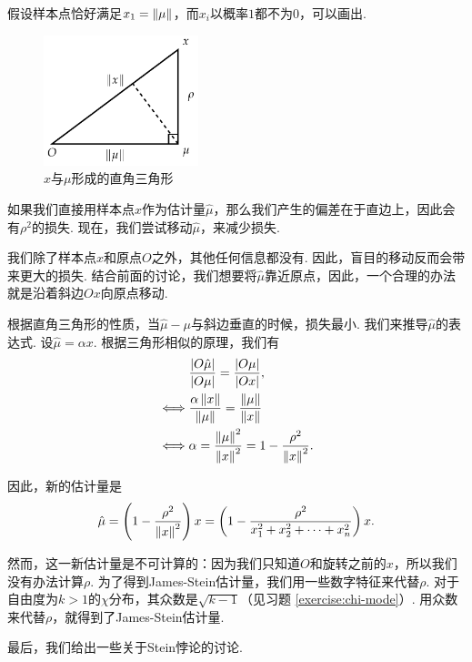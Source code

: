 假设样本点恰好满足$x_1=\left\|\mu\right\|$，而$x_i$以概率$1$都不为$0$，可以画出. 
\begin{figure}[ht]
    \centering
    \includegraphics[width=0.4\textwidth]{figures/J-L-lemma/triangle.pdf}
    \caption{$x$与$\mu$形成的直角三角形}
    \label{fig:triangle}
\end{figure}

如果我们直接用样本点$x$作为估计量$\hat\mu$，那么我们产生的偏差在于直边上，因此会有$\rho^2$的损失. 现在，我们尝试移动$\hat\mu$，来减少损失. 

我们除了样本点$x$和原点$O$之外，其他任何信息都没有. 因此，盲目的移动反而会带来更大的损失. 结合前面的讨论，我们想要将$\hat\mu$靠近原点，因此，一个合理的办法就是沿着斜边$Ox$向原点移动. 

根据直角三角形的性质，当$\hat\mu-\mu$与斜边垂直的时候，损失最小. 我们来推导$\hat\mu$的表达式. 设$\hat\mu=\alpha x$. 根据三角形相似的原理，我们有
\begin{align*}
    &\frac{|O\hat\mu|}{|O\mu|}= \frac{|O\mu|}{|Ox|},\\
    \iff&\frac{\alpha\left\|x\right\|}{\left\|\mu\right\|}=\frac{\left\|\mu\right\|}{\left\|x\right\|}\\
    \iff&\alpha = \frac{\left\|\mu\right\|^2}{\left\|x\right\|^2}=1-\frac{\rho^2}{\left\|x\right\|^2}.
\end{align*}

因此，新的估计量是
\[\hat\mu = \left(1-\frac{\rho^2}{\left\|x\right\|^2}\right)x=\left(1-\frac{\rho^2}{x_1^2+x_2^2+\dots+x_n^2}\right)x.\]

然而，这一新估计量是不可计算的：因为我们只知道$O$和旋转之前的$x$，所以我们没有办法计算$\rho$. 为了得到James-Stein估计量，我们用一些数字特征来代替$\rho$. 对于自由度为$k>1$的$\chi$分布，其众数是$\sqrt{k-1}$（见习题 \ref{exercise:chi-mode}）. 用众数来代替$\rho$，就得到了James-Stein估计量. 

最后，我们给出一些关于Stein悖论的讨论. 

